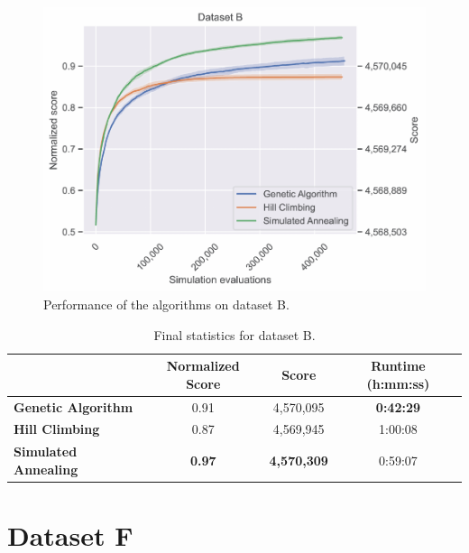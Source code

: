 \begin{figure}[h]
    \centering
    \includegraphics[width=\linewidth]{img/experiments/pdfa-b_Genetic_Algorithm_Hill_Climbing_Simulated_Annealing.pdf}
    \caption[Performance of the algorithms on dataset B]{
        Performance of the algorithms on dataset B.
    }
    \label{fig:dataset_b_experiment}
\end{figure}

\bigskip

\begin{table}[h]
\centering\footnotesize\sf
\begin{tabular}{lccc}
\toprule
& Normalized Score & Score & Runtime (h:mm:ss) \\
\midrule
\textcolor{myblue}{\textbf{Genetic Algorithm}} & 0.91 & 4,570,095 & \textbf{0:42:29} \\
\textcolor{myorange}{\textbf{Hill Climbing}} & 0.87 & 4,569,945 & 1:00:08 \\
\textcolor{mygreen}{\textbf{Simulated Annealing}} & \textbf{0.97} & \textbf{4,570,309} & 0:59:07 \\
\bottomrule
\end{tabular}
\caption[Statistics for dataset B]{
    Final statistics for dataset B.
}
\label{tab:dataset_b_results}
\end{table}

\newpage
\section{Dataset F} \label{sec:dataset_f}

